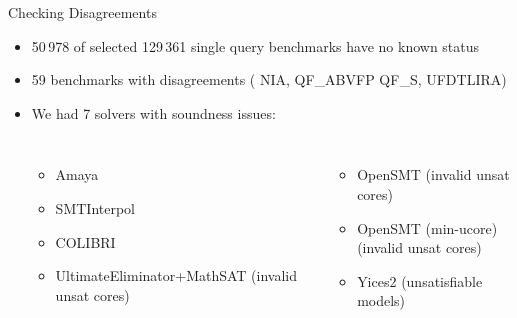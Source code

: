 \documentclass[table]{beamer}
\newcommand\vitem{\vfill\item}
\begin{document}
\begin{frame}{Checking Disagreements}

  \begin{itemize}
  \item 50\,978 of selected 129\,361 single query benchmarks have no known status

  \vitem 59 benchmarks with disagreements (%
  NIA,
  QF\_ABVFP
  QF\_S,
  UFDTLIRA)

  \vitem We had 7 solvers with soundness issues:
  \begin{columns}
    \begin{itemize}
      \item Amaya
      \item SMTInterpol
      \item COLIBRI
      \item UltimateEliminator+MathSAT (invalid unsat cores)
    \end{itemize}
    \begin{itemize}
    \item OpenSMT (invalid unsat cores)
    \item OpenSMT (min-ucore) \\ (invalid unsat cores)
    \item Yices2 (unsatisfiable models)
    \end{itemize}
\end{columns}

  \end{itemize}
  \end{frame}


\end{document}

